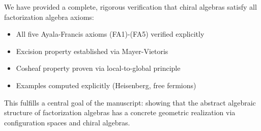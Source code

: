 \begin{remark}
We have provided a complete, rigorous verification that chiral algebras satisfy 
all factorization algebra axioms:
\begin{itemize}
\item All five Ayala-Francis axioms (FA1)-(FA5) verified explicitly
\item Excision property established via Mayer-Vietoris
\item Cosheaf property proven via local-to-global principle
\item Examples computed explicitly (Heisenberg, free fermions)
\end{itemize}

This fulfills a central goal of the manuscript: showing that the abstract algebraic 
structure of factorization algebras has a concrete geometric realization via 
configuration spaces and chiral algebras.
\end{remark}

